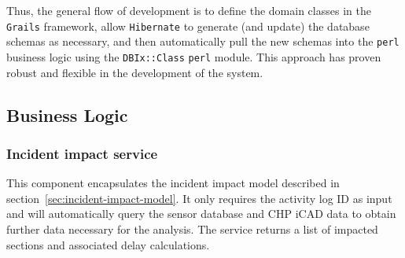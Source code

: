 \documentclass[12pt]{report}
\begin{document}
Thus, the general flow of development is to define the domain classes in the
\texttt{Grails} framework, allow \texttt{Hibernate} to generate (and update) the
database schemas as necessary, and then automatically pull the new schemas into
the \texttt{perl} business logic using the \texttt{DBIx::Class} \texttt{perl}
module.  This approach has proven robust and flexible in the development of the
system.


\subsection{Business Logic}
\label{sec:logic}


\subsubsection{Incident impact service}

\label{sec:incident-impact-service}



This component encapsulates the incident impact model described in
section~\ref{sec:incident-impact-model}.  It only requires the
activity log ID as input and will automatically query the sensor
database and \ac{CHP} \ac{iCAD} data to obtain further data necessary
for the analysis.  The service returns a list of impacted sections and
associated delay calculations.
\end{document}
